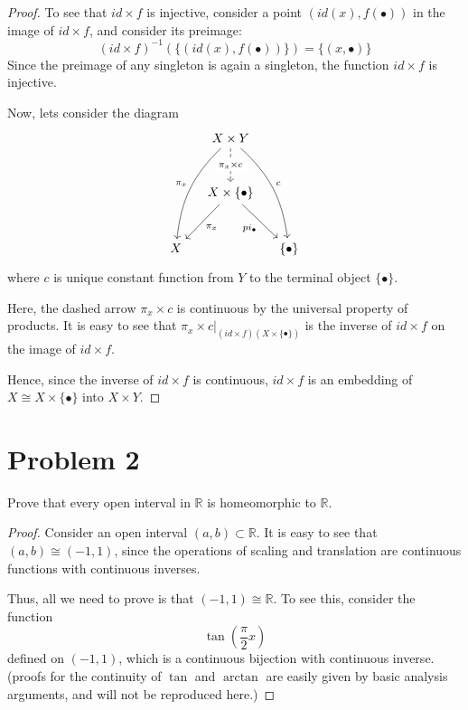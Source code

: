 \documentclass[fontsize=11pt]{scrartcl} %
\numberwithin{equation}{section} %
\numberwithin{figure}{section} %
\numberwithin{table}{section} %
\newcommand{\R}{\mathbb{R}}
\begin{document}
\begin{proof}
To see that $id\times f$ is injective, consider a point $(id(x),f(\bullet))$ in the image
of $id\times f$, and consider its preimage:
\[
(id\times f)^{-1}(\{(id(x),f(\bullet))\}) = \{(x,\bullet)\}
\]
Since the preimage of any singleton is again a singleton, the function $id\times f$ is
injective.

Now, lets consider the diagram
\[
\begin{tikzcd}[column sep=small, row sep=large]
 &X\times Y \arrow[d, dashed, "\pi_x \times c" description] \arrow[bend right=20, swap]{ddl}{\pi_x} \arrow[bend left=20]{ddr}{c}& \\
 &X\times \{\bullet\} \arrow{dl}{\pi_x} \arrow[swap]{dr}{pi_{\bullet}} & \\
X & & \{\bullet\}
\end{tikzcd}
\]
where $c$ is unique constant function from $Y$ to the terminal object $\{\bullet\}$.

Here, the dashed arrow $\pi_x\times c$ is continuous by the universal property of products.
It is easy to see that $\pi_x\times c|_{(id\times f)(X\times\{\bullet\})}$ is the
inverse of $id\times f$ on the image of $id\times f$.

Hence, since the inverse of $id\times f$ is continuous, $id\times f$ is an embedding
of $X\cong X\times \{\bullet\}$ into $X\times Y$.
\end{proof}
\section*{Problem 2}
Prove that every open interval in $\R$ is homeomorphic to $\R$.
\\
\begin{proof}
Consider an open interval $(a,b)\subset \R$. It is easy to see that $(a,b)\cong(-1,1)$,
since the operations of scaling and translation are continuous functions with continuous
inverses.

Thus, all we need to prove is that $(-1,1)\cong\R$. To see this, consider the function
\[
\tan(\frac{\pi}{2} x)
\]
defined on $(-1,1)$,
which is a continuous bijection with continuous inverse. (proofs for the continuity of $\tan$ and $\arctan$
are easily given by basic analysis arguments, and will not be reproduced here.)
\end{proof}
\end{document}
